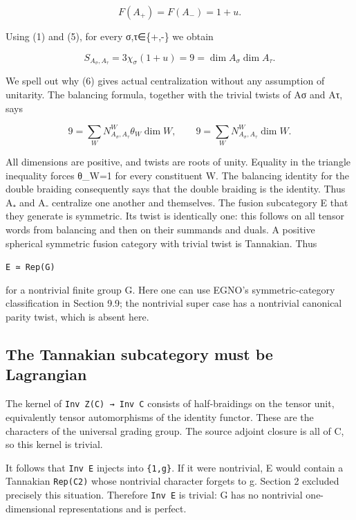 \[
F(A_+)=F(A_-)=1+u. \tag{5}
\]

Using (1) and (5), for every σ,τ∈\{+,-\} we obtain

\[
S_{A_\sigma,A_\tau}=3\chi_\sigma(1+u)=9
=\dim A_\sigma\dim A_\tau. \tag{6}
\]

We spell out why (6) gives actual centralization without any assumption
of unitarity. The balancing formula, together with the trivial twists of
Aσ and Aτ, says

\[
9=\sum_W N_{A_\sigma,A_\tau}^{W}\theta_W\dim W,
\qquad
9=\sum_W N_{A_\sigma,A_\tau}^{W}\dim W.
\]

All dimensions are positive, and twists are roots of unity. Equality in
the triangle inequality forces θ\_W=1 for every constituent W. The
balancing identity for the double braiding consequently says that the
double braiding is the identity. Thus A₊ and A₋ centralize one another
and themselves. The fusion subcategory E that they generate is
symmetric. Its twist is identically one: this follows on all tensor
words from balancing and then on their summands and duals. A positive
spherical symmetric fusion category with trivial twist is Tannakian.
Thus

\texttt{E ≃ Re\allowbreak{}p(G)}

for a nontrivial finite group G. Here one can use EGNO's
symmetric-category classification in Section 9.9; the nontrivial super
case has a nontrivial canonical parity twist, which is absent here.

\hypertarget{the-tannakian-subcategory-must-be-lagrangian}{%
\subsection{The Tannakian subcategory must be
Lagrangian}\label{the-tannakian-subcategory-must-be-lagrangian}}

The kernel of \texttt{Inv Z(\allowbreak{}C) → I\allowbreak{}nv C}
consists of half-braidings on the tensor unit, equivalently tensor
automorphisms of the identity functor. These are the characters of the
universal grading group. The source adjoint closure is all of C, so this
kernel is trivial.

It follows that \texttt{Inv E} injects into \texttt{\{1,g\}}. If it were
nontrivial, E would contain a Tannakian \texttt{Rep(C2\allowbreak{})}
whose nontrivial character forgets to g. Section 2 excluded precisely
this situation. Therefore \texttt{Inv E} is trivial: G has no nontrivial
one-dimensional representations and is perfect.

